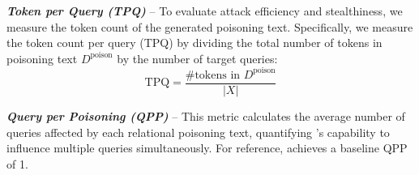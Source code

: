 





\vspace{2pt}
\textbf{\textit{Token per Query (TPQ)}} -- To evaluate attack efficiency and stealthiness, we measure the token count of the generated poisoning text. Specifically, we measure the token count per query (TPQ) by dividing the total number of tokens in poisoning text $D^\mathrm{poison}$ by the number of target queries:
\begin{equation}
\textrm{TPQ} = \frac{\text{\# tokens in } D^\mathrm{poison}}{|X|}
\end{equation}

\vspace{2pt}
\textbf{\textit{Query per Poisoning (QPP)}} -- This metric calculates the average number of queries affected by each relational poisoning text, quantifying \attack's capability to influence multiple queries simultaneously. For reference, \prag achieves a baseline QPP of 1.

